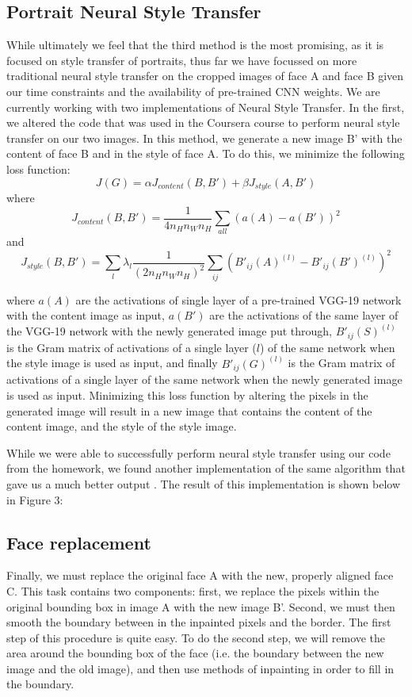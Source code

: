 \documentclass{article}
\begin{document}
\subsection{Portrait Neural Style Transfer}

While ultimately we feel that the third method is the most promising, as it is focused on style transfer of portraits, thus far we have focussed on more traditional neural style transfer on the cropped images of face A and face B given our time constraints and the availability of pre-trained CNN weights. We are currently working with two implementations of Neural Style Transfer. In the first, we altered the code that was used in the Coursera course to perform neural style transfer on our two images. In this method, we generate a new image B' with the content of face B and in the style of face A. To do this, we minimize the following loss function:
\[
J(G)=\alpha J_{content}(B,B')+\beta J_{style}(A,B')
\]
where
\[
 J_{content}(B,B') = \frac{1}{4n_Hn_Wn_H} \sum_{all} (a(A) - a(B'))^2
\]
and 
\[
 J_{style}(B,B') = \sum_l  \lambda_l \frac{1}{(2n_Hn_Wn_H)^2} \sum_{ij} (B'_{ij}(A)^{(l)} - B'_{ij}(B')^{(l)})^2
\]

where $a(A)$ are the activations of single layer of a pre-trained VGG-19 network with the content image as input, $a(B')$ are the activations of the same layer of the VGG-19 network with the newly generated image put through, $B'_{ij}(S)^{(l)}$ is the Gram matrix of activations of a single layer ($l$) of the same network when the style image is used as input, and finally $B'_{ij}(G)^{(l)}$ is the Gram matrix of activations of a single layer of the same network when the newly generated image is used as input. Minimizing this loss function by altering the pixels in the generated image will result in a new image that contains the content of the content image, and the style of the style image. 

While we were able to successfully perform neural style transfer using our code from the homework, we found another implementation of the same algorithm that gave us a much better output \cite{NeuralStyleTranferGithub}. The result of this implementation is shown below in Figure 3:

\subsection{Face replacement}

Finally, we must replace the original face A with the new, properly aligned face C. This task contains two components: first, we replace the pixels within the original bounding box in image A with the new image B'. Second, we must then smooth the boundary between in the inpainted pixels and the border. The first step of this procedure is quite easy. To do the second step, we will remove the area around the bounding box of the face (i.e. the boundary between the new image and the old image), and then use methods of inpainting in order to fill in the boundary. 
\end{document}
